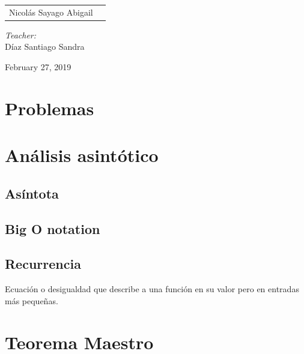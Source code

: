 \documentclass[12pt]{article}
\begin{document}
\begin{titlepage}
\begin{center}
\begin{minipage}{0.5\textwidth}
\begin{flushleft}
					\begin{tabular}{ll}
				     Nicolás Sayago Abigail\\

				\end{tabular}
				\end{flushleft}
			\end{minipage}%
			\begin{minipage}{0.5\textwidth}
				\begin{flushright} \large
					\emph{Teacher:} \\
					Díaz Santiago Sandra  \\
				\end{flushright}
			\end{minipage}
			
			\vfill
			
			{\large February 27, 2019}
		\end{center}
	\end{titlepage}
	
    \tableofcontents
    \newpage
    
    \section{Problemas}

    \section{Análisis asintótico}
        \subsection{Asíntota}
        
        \subsection{Big O notation}
        
        \subsection{Recurrencia}
            Ecuación o desigualdad que describe a una función en su valor pero en entradas más pequeñas.
    
    \section{Teorema Maestro}
    
        
        
        
    
    
\end{document}
